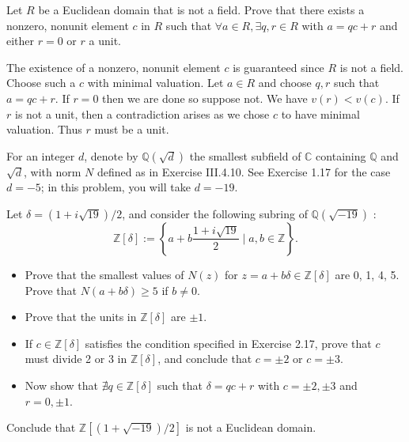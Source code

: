 \documentclass[../../master.tex]{subfiles}
\begin{document}
    \begin{problem}
        Let $R$ be a Euclidean domain that is not a field. Prove that there
        exists a nonzero, nonunit element $c$ in $R$ such that $\forall a \in R,
        \exists q, r \in R$ with $a = qc + r$ and either $r = 0$ or $r$ a unit.
    \end{problem}

    \begin{solution}
        The existence of a nonzero, nonunit element $c$ is guaranteed since $R$
        is not a field. Choose such a $c$ with minimal valuation. Let $a \in R$
        and choose $q, r$ such that $a = qc + r$. If $r = 0$ then we are done so
        suppose not. We have $v(r) < v(c)$. If $r$ is not a unit, then a
        contradiction arises as we chose $c$ to have minimal valuation. Thus
        $r$ must be a unit.
    \end{solution}

    \begin{problem}
        For an integer $d$, denote by $\mathbb{Q}(\sqrt{d})$ the smallest
        subfield of $\mathbb{C}$ containing $\mathbb{Q}$ and $\sqrt{d}$, with
        norm $N$ defined as in Exercise III.4.10. See Exercise 1.17 for the case
        $d = -5$; in this problem, you will take $d = -19$.

        Let $\delta = (1 + i \sqrt{19}) / 2$, and consider the following subring
        of $\mathbb{Q}(\sqrt{-19})$ :
        \[
            \mathbb{Z}[\delta] := \left\{ a + b \frac{1 + i \sqrt{19}}{2} \mid a,
            b \in \mathbb{Z} \right\}.
        \] 
        \begin{itemize}
            \item Prove that the smallest values of $N(z)$ for $z = a + b \delta
                \in \mathbb{Z}[\delta]$ are 0, 1, 4, 5. Prove that $N(a + b
                \delta) \geq 5$ if $b \neq 0$.
            \item Prove that the units in $\mathbb{Z}[\delta]$ are $\pm 1$.
            \item If $c \in \mathbb{Z}[\delta]$ satisfies the condition
                specified in Exercise 2.17, prove that $c$ must divide 2 or 3 in
                $\mathbb{Z}[\delta]$, and conclude that $c = \pm 2$ or $c = \pm
                3$.
            \item Now show that $\nexists q \in \mathbb{Z}[\delta]$ such that
                $\delta = qc + r$ with $c = \pm 2, \pm 3$ and $r = 0, \pm 1$.
        \end{itemize}
        Conclude that $\mathbb{Z}[(1 + \sqrt{-19}) / 2]$ is not a Euclidean
        domain.
    \end{problem}
\end{document}
